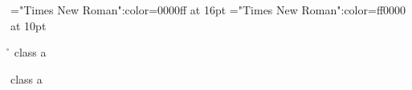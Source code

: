 \font\ba="Times New Roman":color=0000ff at 16pt
\font\a="Times New Roman":color=ff0000 at 10pt
 \r\n
\a class a 

\ba 

\a class a 


\bye
